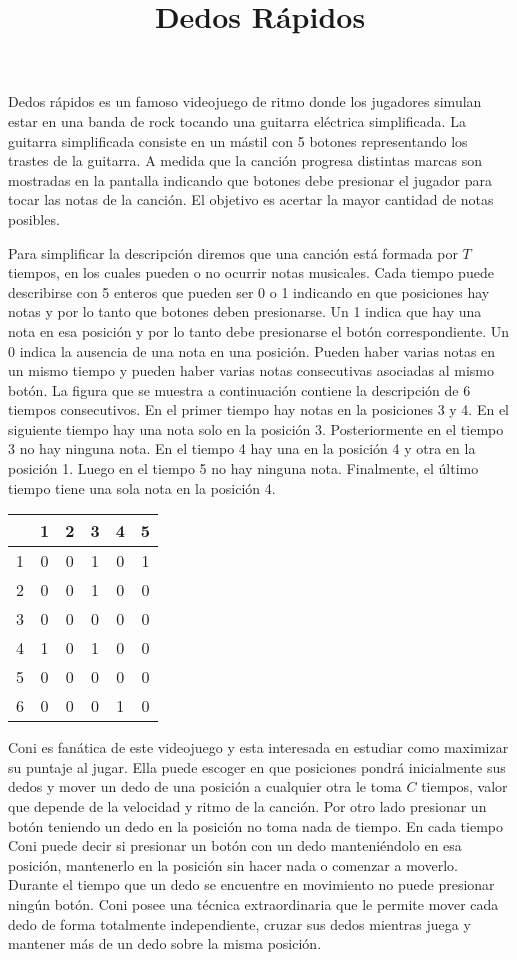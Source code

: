 \documentclass{oci}
\title{Dedos Rápidos}
\begin{document}
\begin{problemDescription}
  Dedos rápidos es un famoso videojuego de ritmo donde los jugadores simulan
  estar en una banda de rock tocando una guitarra eléctrica simplificada.
  La guitarra simplificada consiste en un mástil con 5 botones representando los
  trastes de la guitarra.
  A medida que la canción progresa distintas marcas son mostradas en la pantalla
  indicando que botones debe presionar el jugador para tocar las notas de la canción.
  El objetivo es acertar la mayor cantidad de notas posibles.

  Para simplificar la descripción diremos que una canción está formada por $T$
  tiempos, en los cuales pueden o no ocurrir notas musicales.
  Cada tiempo puede describirse con 5 enteros que pueden ser 0 o 1 indicando en
  que posiciones hay notas y por lo tanto que botones deben presionarse.
  Un 1 indica que hay una nota en esa posición y por lo tanto debe presionarse
  el botón correspondiente.
  Un 0 indica la ausencia de una nota en una posición.
  Pueden haber varias notas en un mismo tiempo y pueden haber varias
  notas consecutivas asociadas al mismo botón.
  La figura que se muestra a continuación contiene la descripción de 6 tiempos
  consecutivos.
  En el primer tiempo hay notas en la posiciones 3 y 4.
  En el siguiente tiempo hay una nota solo en la posición 3.
  Posteriormente en el tiempo 3 no hay ninguna nota.
  En el tiempo 4 hay una en la posición 4 y otra en la posición 1.
  Luego en el tiempo 5 no hay ninguna nota.
  Finalmente, el último tiempo tiene una sola nota en la posición 4.

  \begin{center}
    \begin{tabular}{r|ccccc}
        & 1 & 2 & 3 & 4 & 5 \\
      \hline
      1 & 0 & 0 & 1 & 0 & 1 \\
      2 & 0 & 0 & 1 & 0 & 0 \\
      3 & 0 & 0 & 0 & 0 & 0 \\
      4 & 1 & 0 & 1 & 0 & 0 \\
      5 & 0 & 0 & 0 & 0 & 0 \\
      6 & 0 & 0 & 0 & 1 & 0 \\
    \end{tabular}
  \end{center}

  Coni es fanática de este videojuego y esta interesada en estudiar como
  maximizar su puntaje al jugar.
  Ella puede escoger en que posiciones pondrá inicialmente sus dedos y mover un
  dedo de una posición a cualquier otra le toma $C$ tiempos, valor que depende
  de la velocidad y ritmo de la canción.
  Por otro lado presionar un botón teniendo un dedo en la posición no toma nada
  de tiempo.
  En cada tiempo Coni puede decir si presionar un botón con un dedo
  manteniéndolo en esa posición, mantenerlo en la posición sin hacer nada o
  comenzar a moverlo.
  Durante el tiempo que un dedo se encuentre en movimiento no puede presionar
  ningún botón.
  Coni posee una técnica extraordinaria que le permite mover cada dedo
  de forma totalmente independiente, cruzar sus dedos mientras juega y mantener
  más de un dedo sobre la misma posición.


\end{problemDescription}
\end{document}
